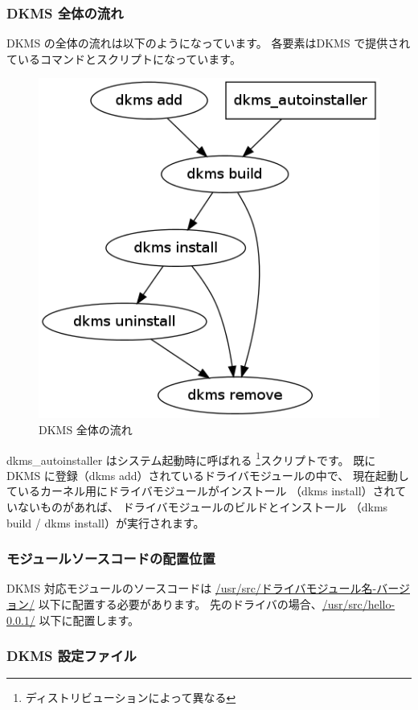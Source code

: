 \documentclass[mingoth,a4paper]{jsarticle}
\begin{document}
\subsubsection{DKMS 全体の流れ}

DKMS の全体の流れは以下のようになっています。
各要素はDKMS で提供されているコマンドとスクリプトになっています。

\begin{figure}[ht] 
 \begin{center}
  \includegraphics[width=0.4\hsize]{image201202/dkms.png}
 \end{center}
\label{fig:dkms}\caption{DKMS 全体の流れ}
\end{figure}

dkms\_autoinstaller はシステム起動時に呼ばれる
\footnote{ディストリビューションによって異なる}スクリプトです。
既に DKMS に登録（dkms add）されているドライバモジュールの中で、
現在起動しているカーネル用にドライバモジュールがインストール
（dkms install）されていないものがあれば、
ドライバモジュールのビルドとインストール
（dkms build / dkms install）が実行されます。

\subsubsection{モジュールソースコードの配置位置}

DKMS 対応モジュールのソースコードは
\url{/usr/src/ドライバモジュール名-バージョン/} 以下に配置する必要があります。
先のドライバの場合、\url{/usr/src/hello-0.0.1/} 以下に配置します。

\subsubsection{DKMS 設定ファイル}
\end{document}
